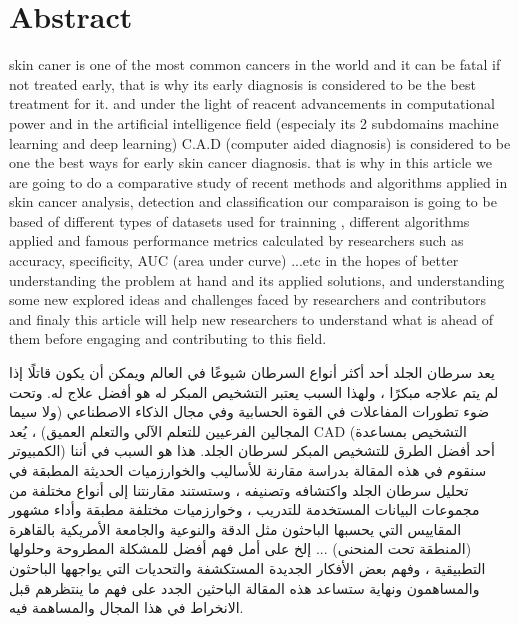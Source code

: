 \section*{Abstract}
skin caner is one of the most common cancers in the world and it can be fatal if not treated early, that is why its early diagnosis is considered to be the best treatment for it. and under the light of reacent advancements in computational power and in the artificial intelligence field (especialy its 2 subdomains machine learning and deep learning) C.A.D (computer aided diagnosis) is considered to be one the best ways for early skin cancer diagnosis. that is why in this article we are going to do a comparative study of recent methods and algorithms applied in skin cancer analysis, detection and classification our comparaison is going to be based of different types of datasets used for trainning , different algorithms applied and famous performance metrics calculated by researchers such as accuracy, specificity, AUC (area under curve) ...etc in the hopes of better understanding the problem at hand and its applied solutions, and understanding some new explored ideas and challenges faced by researchers and contributors and finaly this article will help new researchers to understand what is ahead of them before engaging and contributing to this field.

\begin{center}
\end{center}
\begin{RLtext}

    يعد سرطان الجلد أحد أكثر أنواع السرطان شيوعًا في العالم ويمكن أن يكون قاتلًا إذا لم يتم علاجه مبكرًا ، ولهذا السبب يعتبر التشخيص المبكر له هو أفضل علاج له. وتحت ضوء تطورات المفاعلات في القوة الحسابية وفي مجال الذكاء الاصطناعي (ولا سيما المجالين الفرعيين للتعلم الآلي والتعلم العميق) ، يُعد CAD (التشخيص بمساعدة الكمبيوتر) أحد أفضل الطرق للتشخيص المبكر لسرطان الجلد. هذا هو السبب في أننا سنقوم في هذه المقالة بدراسة مقارنة للأساليب والخوارزميات الحديثة المطبقة في تحليل سرطان الجلد واكتشافه وتصنيفه ، وستستند مقارنتنا إلى أنواع مختلفة من مجموعات البيانات المستخدمة للتدريب ، وخوارزميات مختلفة مطبقة وأداء مشهور المقاييس التي يحسبها الباحثون مثل الدقة والنوعية والجامعة الأمريكية بالقاهرة (المنطقة تحت المنحنى) ... إلخ على أمل فهم أفضل للمشكلة المطروحة وحلولها التطبيقية ، وفهم بعض الأفكار الجديدة المستكشفة والتحديات التي يواجهها الباحثون والمساهمون ونهاية ستساعد هذه المقالة الباحثين الجدد على فهم ما ينتظرهم قبل الانخراط في هذا المجال والمساهمة فيه.


\end{RLtext}



